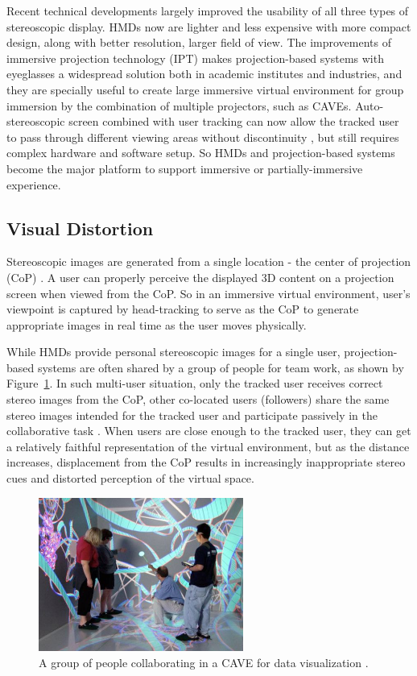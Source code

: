 Recent technical developments largely improved the usability of all three types of stereoscopic display. HMDs now are lighter and less expensive with more compact design, along with better resolution, larger field of view. The improvements of immersive projection technology (IPT) \citep{Bullinger1997Immersive} makes projection-based systems with eyeglasses a widespread solution both in academic institutes and industries, and they are specially useful to create large immersive virtual environment for group immersion by the combination of multiple projectors, such as CAVEs. Auto-stereoscopic screen combined with user tracking can now allow the tracked user to pass through different viewing areas without discontinuity \citep{Kooima2010Tiled}, but still requires complex hardware and software setup. So HMDs and projection-based systems become the major platform to support immersive or partially-immersive experience.


\subsection{Visual Distortion}
Stereoscopic images are generated from a single location - the center of projection (CoP) \citep{Banks2009Perception}. A user can properly perceive the displayed 3D content on a projection screen when viewed from the CoP. So in an immersive virtual environment, user's viewpoint is captured by head-tracking to serve as the CoP to generate appropriate images in real time as the user moves physically.

While HMDs provide personal stereoscopic images for a single user, projection-based systems are often shared by a group of people for team work, as shown by Figure~\ref{fig:2_group}. In such multi-user situation, only the tracked user receives correct stereo images from the CoP, other co-located users (followers) share the same stereo images intended for the tracked user and participate passively in the collaborative task \citep{Bayon2006Multiple}. When users are close enough to the tracked user, they can get a relatively faithful representation of the virtual environment, but as the distance increases, displacement from the CoP results in increasingly inappropriate stereo cues and distorted perception of the virtual space.

\begin{figure}[htb]
  \centering
  \includegraphics[width=0.6\textwidth]{figures/ch2/group}
  \caption{\label{fig:2_group}A group of people collaborating in a CAVE for data visualization \citep{Pollock2012Right}.}
\end{figure}

